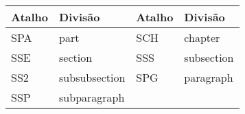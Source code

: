 % 
% 
% 
% 
% 
\begin{tabular}{llll}
    \hline
    Atalho & Divisão & Atalho & Divisão \\ \hline
    \textsf{SPA} & \textsf{part} & \textsf{SCH} & \textsf{chapter} \\
    \textsf{SSE} & \textsf{section} & \textsf{SSS} & \textsf{subsection} \\
    \textsf{SS2} & \textsf{subsubsection} & \textsf{SPG} & \textsf{paragraph} \\
    \textsf{SSP} & \textsf{subparagraph} & & \\ \hline
\end{tabular}

